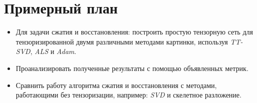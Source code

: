 \documentclass[]{scrartcl}
\begin{document}
\section{Примерный план}
\begin{itemize}
	\item Для задачи сжатия и восстановления: построить простую тензорную сеть для тензоризированной двумя различными методами картинки, используя  \textit{TT-SVD}, \textit{ALS} и \textit{Adam}.
	\item Проанализировать полученные результаты с помощью объявленных метрик.
	\item Сравнить работу алгоритма сжатия и восстановления с методами, работающими без тензоризации, например: \textit{SVD} и скелетное разложение. 
\end{itemize}


\end{document}
